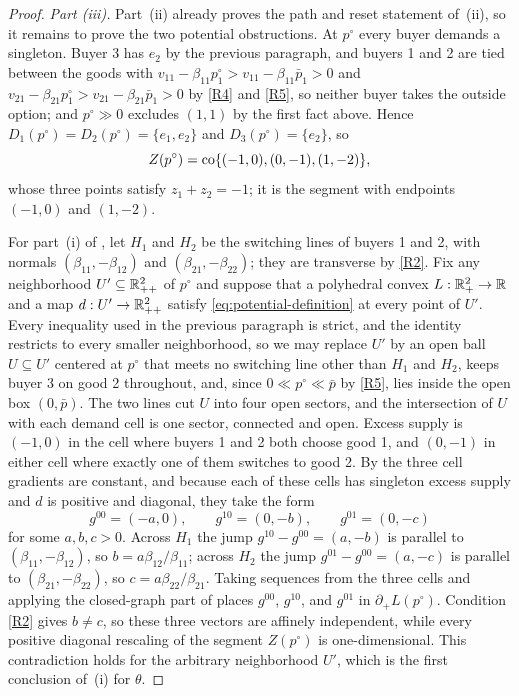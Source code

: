 \begin{proof}
\emph{Part \textup{(iii)}.} Part~\textup{(ii)} already proves the path and reset statement of \,(ii), so it remains to prove the two potential obstructions. At $p^\circ$ every buyer demands a singleton. Buyer 3 has $e_2$ by the previous paragraph, and buyers 1 and 2 are tied between the goods with $v_{11}-\beta_{11}p^\circ_1>v_{11}-\beta_{11}\bar p_1>0$ and $v_{21}-\beta_{21}p^\circ_1>v_{21}-\beta_{21}\bar p_1>0$ by \ref{R4} and \ref{R5}, so neither buyer takes the outside option; and $p^\circ\gg0$ excludes $(1,1)$ by the first fact above. Hence $D_1(p^\circ)=D_2(p^\circ)=\{e_1,e_2\}$ and $D_3(p^\circ)=\{e_2\}$, so
\[
Z(p^\circ)=\operatorname{co}\{(-1,0),(0,-1),(1,-2)\},
\]
whose three points satisfy $z_1+z_2=-1$; it is the segment with endpoints $(-1,0)$ and $(1,-2)$.

For part~(i) of , let $H_1$ and $H_2$ be the switching lines of buyers 1 and 2, with normals $(\beta_{11},-\beta_{12})$ and $(\beta_{21},-\beta_{22})$; they are transverse by \ref{R2}. Fix any neighborhood $U'\subseteq\mathbb{R}_{++}^2$ of $p^\circ$ and suppose that a polyhedral convex $L:\mathbb{R}_+^2\to\mathbb{R}$ and a map $d:U'\to\mathbb{R}_{++}^2$ satisfy \eqref{eq:potential-definition} at every point of $U'$. Every inequality used in the previous paragraph is strict, and the identity restricts to every smaller neighborhood, so we may replace $U'$ by an open ball $U\subseteq U'$ centered at $p^\circ$ that meets no switching line other than $H_1$ and $H_2$, keeps buyer 3 on good 2 throughout, and, since $0\ll p^\circ\ll\bar p$ by \ref{R5}, lies inside the open box $(0,\bar p)$. The two lines cut $U$ into four open sectors, and the intersection of $U$ with each demand cell is one sector, connected and open. Excess supply is $(-1,0)$ in the cell where buyers 1 and 2 both choose good 1, and $(0,-1)$ in either cell where exactly one of them switches to good 2. By  the three cell gradients are constant, and because each of these cells has singleton excess supply and $d$ is positive and diagonal, they take the form
\[
g^{00}=(-a,0),\qquad g^{10}=(0,-b),\qquad g^{01}=(0,-c)
\]
for some $a,b,c>0$. Across $H_1$ the jump $g^{10}-g^{00}=(a,-b)$ is parallel to $(\beta_{11},-\beta_{12})$, so $b=a\beta_{12}/\beta_{11}$; across $H_2$ the jump $g^{01}-g^{00}=(a,-c)$ is parallel to $(\beta_{21},-\beta_{22})$, so $c=a\beta_{22}/\beta_{21}$. Taking sequences from the three cells and applying the closed-graph part of  places $g^{00}$, $g^{10}$, and $g^{01}$ in $\partial_+L(p^\circ)$. Condition \ref{R2} gives $b\ne c$, so these three vectors are affinely independent, while every positive diagonal rescaling of the segment $Z(p^\circ)$ is one-dimensional. This contradiction holds for the arbitrary neighborhood $U'$, which is the first conclusion of \,(i) for $\theta$.


\end{proof}
